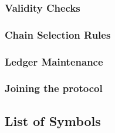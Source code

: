 \subsubsection{Validity Checks}


\subsubsection{Chain Selection Rules}


\subsubsection{Ledger Maintenance}


\subsubsection{Joining the protocol}


\newpage

\subsection{List of Symbols}\label{subsec:list-of-symbols}






